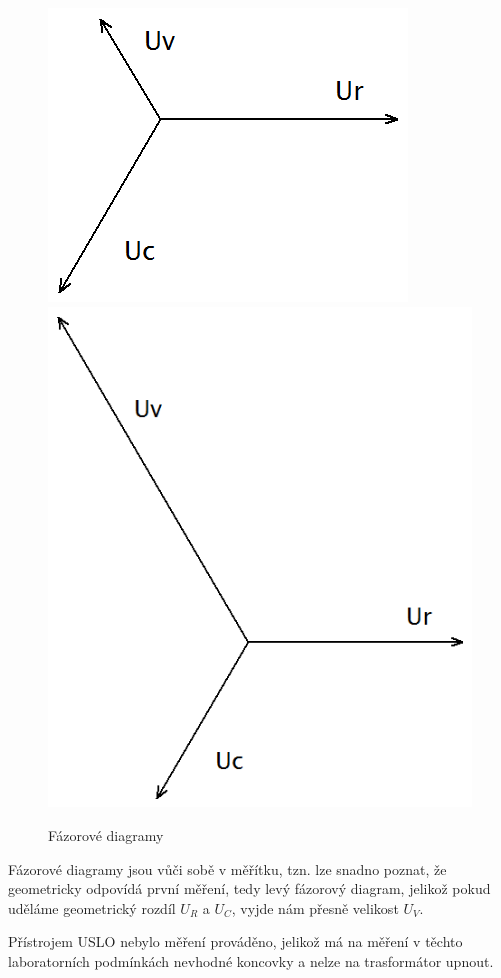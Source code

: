 \documentclass[12pt]{article} %
\begin{document}
\begin{figure}[H]
\center
\includegraphics[scale=0.5]{fazor1.png}
\includegraphics[scale=0.5]{fazor2.png}
\caption{Fázorové diagramy}
\end{figure}
Fázorové diagramy jsou vůči sobě v měřítku, tzn. lze snadno poznat, že geometricky odpovídá první měření, tedy levý fázorový diagram, jelikož pokud uděláme geometrický rozdíl $U_R$ a $U_C$, vyjde nám přesně velikost $U_V$.

Přístrojem USLO nebylo měření prováděno, jelikož má na měření v těchto laboratorních podmínkách nevhodné koncovky a nelze na trasformátor upnout.
\end{document}
